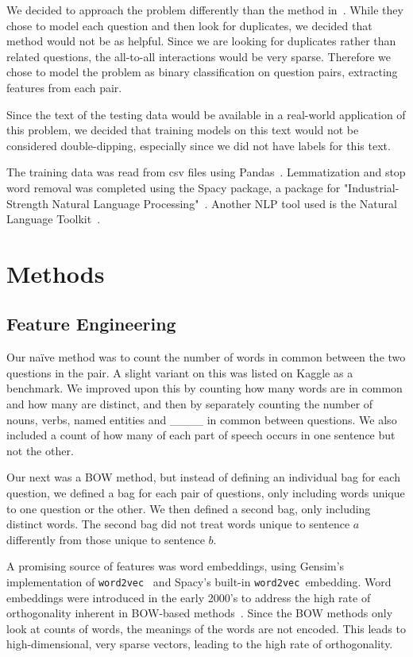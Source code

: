 \documentclass{article} %
\newcommand{\wordtvec}{\texttt{word2vec}}
\begin{document}
We decided to approach the problem differently than the method in~\cite{Zhang2015}. While they chose to model each question and then look for duplicates, we decided that method would not be as helpful. Since we are looking for duplicates rather than related questions, the all-to-all interactions would be very sparse. Therefore we chose to model the problem as binary classification on question pairs, extracting features from each pair. 

Since the text of the testing data would be available in a real-world application of this problem, we decided that training models on this text would not be considered double-dipping, especially since we did not have labels for this text. 

The training data was read from csv files using Pandas~\cite{pandas}. Lemmatization and stop word removal was completed using the Spacy package, a package for "Industrial-Strength Natural Language Processing"~\cite{spacy}. Another NLP tool used is the Natural Language Toolkit~\cite{nltk}.

\section{Methods}

\subsection{Feature Engineering} \label{sub:features}

Our na\"ive method was to count the number of words in common between the two questions in the pair. A slight variant on this was listed on Kaggle as a benchmark. We improved upon this by counting how many words are in common and how many are distinct, and then by separately counting the number of nouns, verbs, named entities and \_\_\_\_ in common between questions. We also included a count of how many of each part of speech occurs in one sentence but not the other. 

Our next was a BOW method, but instead of defining an individual bag for each question, we defined a bag for each pair of questions, only including words unique to one question or the other. We then defined a second bag, only including distinct words. The second bag did not treat words unique to sentence $a$ differently from those unique to sentence $b$.

A promising source of features was word embeddings, using Gensim's implementation of \wordtvec~\cite{gensim} and Spacy's built-in \wordtvec\ embedding. Word embeddings were introduced in the early 2000's to address the high rate of orthogonality inherent in BOW-based methods~\cite{Bengio03}. Since the BOW methods only look at counts of words, the meanings of the words are not encoded. This leads to high-dimensional, very sparse vectors, leading to the high rate of orthogonality.
\end{document}
